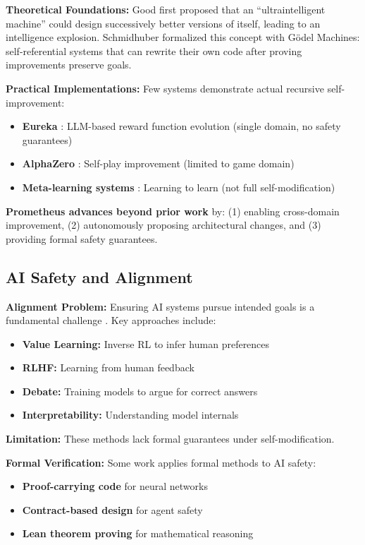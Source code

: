 \documentclass[11pt,letterpaper]{article}
\begin{document}
\textbf{Theoretical Foundations:}
Good \citep{good1965speculations} first proposed that an ``ultraintelligent machine'' could design successively better versions of itself, leading to an intelligence explosion. Schmidhuber \citep{schmidhuber2007godel} formalized this concept with Gödel Machines: self-referential systems that can rewrite their own code after proving improvements preserve goals.

\textbf{Practical Implementations:}
Few systems demonstrate actual recursive self-improvement:
\begin{itemize}
\item \textbf{Eureka} \citep{ma2023eureka}: LLM-based reward function evolution (single domain, no safety guarantees)
\item \textbf{AlphaZero} \citep{silver2017mastering}: Self-play improvement (limited to game domain)
\item \textbf{Meta-learning systems} \citep{finn2017model}: Learning to learn (not full self-modification)
\end{itemize}

\textbf{Prometheus advances beyond prior work} by: (1) enabling cross-domain improvement, (2) autonomously proposing architectural changes, and (3) providing formal safety guarantees.

\subsection{AI Safety and Alignment}

\textbf{Alignment Problem:}
Ensuring AI systems pursue intended goals is a fundamental challenge \citep{russell2019human,bostrom2014superintelligence}. Key approaches include:
\begin{itemize}
\item \textbf{Value Learning:} Inverse RL to infer human preferences \citep{hadfield2016inverse}
\item \textbf{RLHF:} Learning from human feedback \citep{christiano2017deep,ouyang2022training}
\item \textbf{Debate:} Training models to argue for correct answers \citep{irving2018ai}
\item \textbf{Interpretability:} Understanding model internals \citep{olah2018building}
\end{itemize}

\textbf{Limitation:} These methods lack formal guarantees under self-modification.

\textbf{Formal Verification:}
Some work applies formal methods to AI safety:
\begin{itemize}
\item \textbf{Proof-carrying code} for neural networks \citep{katz2017reluplex}
\item \textbf{Contract-based design} for agent safety \citep{amodei2016concrete}
\item \textbf{Lean theorem proving} for mathematical reasoning \citep{avigad2014lean}
\end{itemize}
\end{document}
